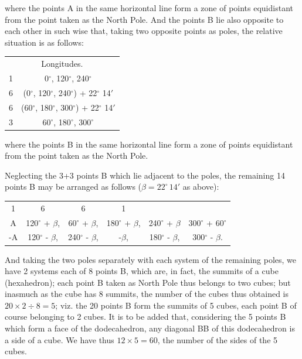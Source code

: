 \documentclass[11pt,a4paper]{book}
\begin{document}
where the points A in the same horizontal line form a zone of points equidistant from the point taken as the North Pole. And the points B lie also opposite to each other in such wise that, taking two opposite points as poles, the relative situation is as follows:

\begin{center}
\begin{tabular}{cc}
\multicolumn{2}{c}{Longitudes.} \\
1 \quad 3 & 0$^\circ$, 120$^\circ$, 240$^\circ$ \\
6 & (0$^\circ$, 120$^\circ$, 240$^\circ$) + 22$^\circ$ 14$'$ \\
6 & (60$^\circ$, 180$^\circ$, 300$^\circ$) + 22$^\circ$ 14$'$ \\
3 & 60$^\circ$, 180$^\circ$, 300$^\circ$ \\
\end{tabular}
\end{center}

where the points B in the same horizontal line form a zone of points equidistant from the point taken as the North Pole.

Neglecting the 3+3 points B which lie adjacent to the poles, the remaining 14 points B may be arranged as follows ($\beta = 22^\circ\, 14'$ as above):

\begin{center}
\begin{tabular}{cccccc}
1 & 6 & 6 & 1 \\
A & 120$^\circ$ + $\beta$, & 60$^\circ$ + $\beta$, & 180$^\circ$ + $\beta$, & 240$^\circ$ + $\beta$ & 300$^\circ$ + 60$^\circ$ \\
-A & 120$^\circ$ - $\beta$, & 240$^\circ$ - $\beta$, & -$\beta$, & 180$^\circ$ - $\beta$, & 300$^\circ$ - $\beta$.
\end{tabular}
\end{center}

And taking the two poles separately with each system of the remaining poles, we have 2 systems each of 8 points B, which are, in fact, the summits of a cube (hexahedron); each point B taken as North Pole thus belongs to two cubes; but inasmuch as the cube has 8 summits, the number of the cubes thus obtained is $20 \times 2 \div 8 = 5$; viz. the 20 points B form the summits of 5 cubes, each point B of course belonging to 2 cubes. It is to be added that, considering the 5 points B which form a face of the dodecahedron, any diagonal BB of this dodecahedron is a side of a cube. We have thus $12 \times 5 = 60$, the number of the sides of the 5 cubes.
\end{document}
